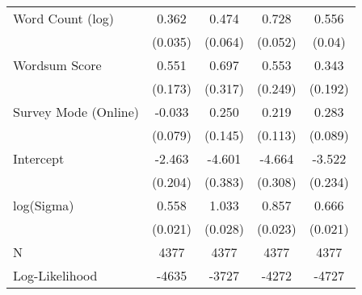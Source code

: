 \begin{table}[ht]
\begin{tabular}{lcccc}
  Word Count (log) &  0.362 &  0.474 &  0.728 &  0.556 \\ 
   & (0.035) & (0.064) & (0.052) & (0.04) \\ 
  Wordsum Score &  0.551 &  0.697 &  0.553 &  0.343 \\ 
   & (0.173) & (0.317) & (0.249) & (0.192) \\ 
  Survey Mode (Online) & -0.033 &  0.250 &  0.219 &  0.283 \\ 
   & (0.079) & (0.145) & (0.113) & (0.089) \\ 
  Intercept & -2.463 & -4.601 & -4.664 & -3.522 \\ 
   & (0.204) & (0.383) & (0.308) & (0.234) \\ 
  log(Sigma) &  0.558 &  1.033 &  0.857 &  0.666 \\ 
   & (0.021) & (0.028) & (0.023) & (0.021) \\ 
   \hline
N & 4377 & 4377 & 4377 & 4377 \\ 
  Log-Likelihood & -4635 & -3727 & -4272 & -4727 \\ 
   \hline
\end{tabular}
\endgroup
\end{table}
